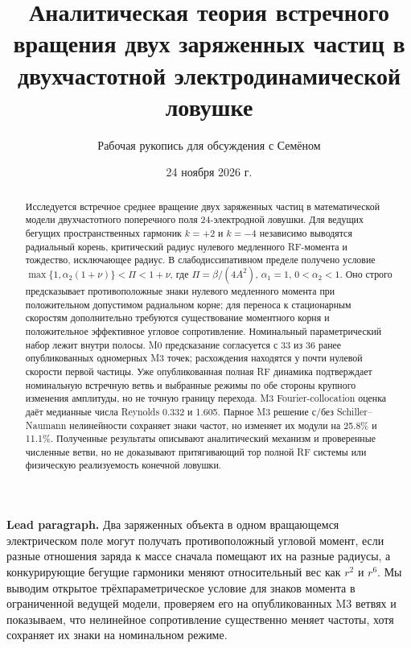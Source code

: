 \documentclass[aip,cha,reprint,a4paper,amsmath,amssymb]{revtex4-2}
\begin{document}
\title{Аналитическая теория встречного вращения двух заряженных частиц в двухчастотной электродинамической ловушке}
\author{Рабочая рукопись для обсуждения с Семёном}
\date{24 ноября 2026 г.}

\begin{abstract}
Исследуется встречное среднее вращение двух заряженных частиц в математической модели двухчастотного поперечного поля 24-электродной ловушки. Для ведущих бегущих пространственных гармоник $k=+2$ и $k=-4$ независимо выводятся радиальный корень, критический радиус нулевого медленного RF-момента и тождество, исключающее радиус. В слабодиссипативном пределе получено условие $\max\{1,\alpha_2(1+\nu)\}<\Pi<1+\nu$, где $\Pi=\beta/(4A^2)$, $\alpha_1=1$, $0<\alpha_2<1$. Оно строго предсказывает противоположные знаки нулевого медленного момента при положительном допустимом радиальном корне; для переноса к стационарным скоростям дополнительно требуются существование моментного корня и положительное эффективное угловое сопротивление. Номинальный параметрический набор лежит внутри полосы. M0 предсказание согласуется с 33 из 36 ранее опубликованных одномерных M3 точек; расхождения находятся у почти нулевой скорости первой частицы. Уже опубликованная полная RF динамика подтверждает номинальную встречную ветвь и выбранные режимы по обе стороны крупного изменения амплитуды, но не точную границу перехода. M3 Fourier-collocation оценка даёт медианные числа Reynolds 0.332 и 1.605. Парное M3 решение с/без Schiller--Naumann нелинейности сохраняет знаки частот, но изменяет их модули на 25.8\% и 11.1\%. Полученные результаты описывают аналитический механизм и проверенные численные ветви, но не доказывают притягивающий тор полной RF системы или физическую реализуемость конечной ловушки.
\end{abstract}

\maketitle

\noindent\textbf{Lead paragraph.} Два заряженных объекта в одном вращающемся электрическом поле могут получать противоположный угловой момент, если разные отношения заряда к массе сначала помещают их на разные радиусы, а конкурирующие бегущие гармоники меняют относительный вес как $r^2$ и $r^6$. Мы выводим открытое трёхпараметрическое условие для знаков момента в ограниченной ведущей модели, проверяем его на опубликованных M3 ветвях и показываем, что нелинейное сопротивление существенно меняет частоты, хотя сохраняет их знаки на номинальном режиме.
\end{document}
